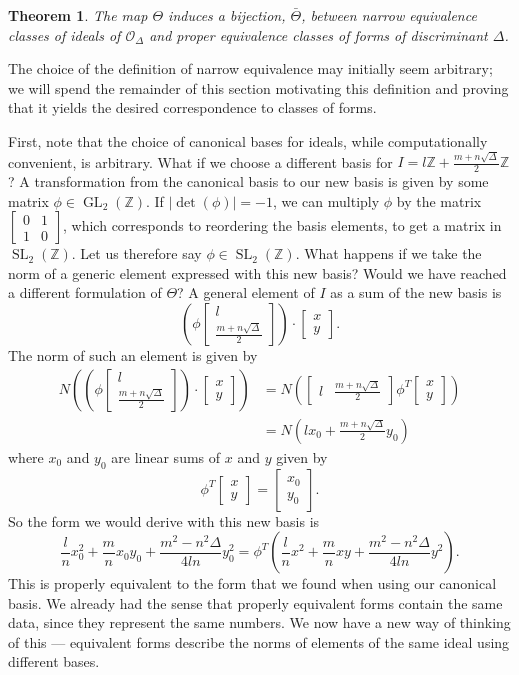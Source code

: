 \documentclass[honours,12pt]{unswthesis}
\newcommand{\Z}{\mathbb{Z}} %
\newcommand{\order}{\mathcal{O}} %
\DeclareMathOperator{\GL}{GL}
\DeclareMathOperator{\SL}{SL}
\newcommand{\bmat}[1]{\begin{bmatrix}#1\end{bmatrix}}
\newtheorem{theorem}{Theorem}[section]
\numberwithin{equation}{section}
\begin{document}
\hspace{2mm}
\begin{theorem} \label{thm-ideal-correspondence}
    The map $\Theta$ induces a bijection, $\bar{\Theta}$, between narrow equivalence classes of ideals of $\order_\Delta$ and proper equivalence classes of forms of discriminant $\Delta$.
\end{theorem}
\hspace{2mm}

The choice of the definition of narrow equivalence may initially seem arbitrary; 
we will spend the remainder of this section motivating this definition and proving that it yields the desired correspondence to classes of forms.

\pagebreak
First, note that the choice of canonical bases for ideals, while computationally convenient, is arbitrary.
What if we choose a different basis for $I = l\Z + \frac{m + n\sqrt\Delta}{2}\Z$?
A transformation from the canonical basis to our new basis is given by some matrix $\phi \in \GL_2(\Z)$.
If $|\det(\phi)| = -1$, we can multiply $\phi$ by the matrix 
$\left[ \begin{smallmatrix} 0 & 1 \\ 1 & 0 \end{smallmatrix} \right]$, 
which corresponds to reordering the basis elements, to get a matrix in $\SL_2(\Z)$.
Let us therefore say $\phi \in \SL_2(\Z)$.
What happens if we take the norm of a generic element expressed with this new basis? 
Would we have reached a different formulation of $\Theta$?
A general element of $I$ as a sum of the new basis is
$$\left( \phi \bmat{l \\ \frac{m + n\sqrt\Delta}{2}} \right) \cdot \bmat{x \\ y}.$$
The norm of such an element is given by
\begin{align*}
    N \left( \left( \phi \bmat{l \\ \frac{m + n\sqrt\Delta}{2}} \right) \cdot \bmat{x \\ y} \right)
    &= N \left( \bmat{l & \frac{m + n\sqrt\Delta}{2}} \phi^T \bmat{x \\ y} \right) \\
    &= N \left( lx_0 + \frac{m + n\sqrt\Delta}{2} y_0 \right)
\end{align*}
where $x_0$ and $y_0$ are linear sums of $x$ and $y$ given by
$$\phi^T \bmat{x \\ y} = \bmat{x_0 \\ y_0}.$$
So the form we would derive with this new basis is
$$\frac{l}{n}x_0^2 + \frac{m}{n}x_0y_0 + \frac{m^2 - n^2\Delta}{4ln} y_0^2 = \phi^T \left( \frac{l}{n}x^2 + \frac{m}{n}xy + \frac{m^2 - n^2\Delta}{4ln} y^2 \right).$$
This is properly equivalent to the form that we found when using our canonical basis.
We already had the sense that properly equivalent forms contain the same data, since they represent the same numbers.
We now have a new way of thinking of this --- equivalent forms describe the norms of elements of the same ideal using different bases.
\end{document}

